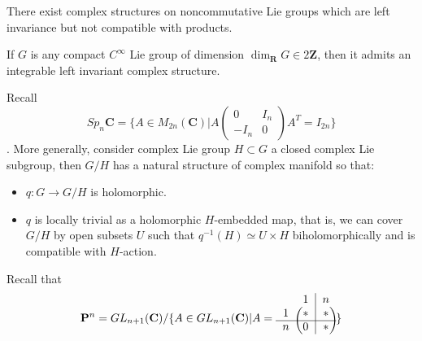 \documentclass[
11pt, %
letterpaper， %
oneside, %
headinclude,footinclude, %
BCOR5mm, %
]{scrartcl}
\newcommand{\Z}{{\mathbf{Z}}}
\newcommand{\R}{{\mathbf{R}}}
\newcommand{\C}{{\mathbf{C}}}
\newcommand{\cp}{{\mathbf{P}}}
\begin{document}
\begin{rem}
	There exist complex structures on noncommutative Lie groups which  are left invariance but not compatible with products.
\end{rem}

\begin{thm}
	If $G$ is any compact $C^{\infty}$ Lie group of dimension $\dim_{\R} G\in 2\Z$, then it admits an integrable left invariant complex structure.
\end{thm}

Recall $$Sp_n{\C}=\{A\in M_{2n}(\C) | A\begin{pmatrix}
0 & I_n\\
-I_n & 0
\end{pmatrix}A^T=I_{2n}\} $$. More generally, consider complex Lie group $H\subset G$ a closed complex Lie subgroup, then $G/H$ has a natural structure of complex manifold so that:
\begin{itemize}
	\item $q: G \to G/H$ is holomorphic.
	\item $q$ is locally trivial as a holomorphic $H$-embedded map, that is, we can cover $G/H$ by open subsets $U$ such that $q^{-1}(H)\simeq U \times H$ biholomorphically and is compatible with $H$-action.
\end{itemize}
Recall that 
\begin{equation*}
\cp^n=GL_{n+1}(\C)/\{A\in GL_{n+1}(\C)| A=
\begin{blockarray}{cc|cccc|cccc}
& 1 & n  \\
\begin{block}{c(c|cccc|cccc)}
1 & * & * \\
\cline{1-10}%
n & 0 & * \\
\end{block}
\end{blockarray}
  \}
\end{equation*}
\end{document}
